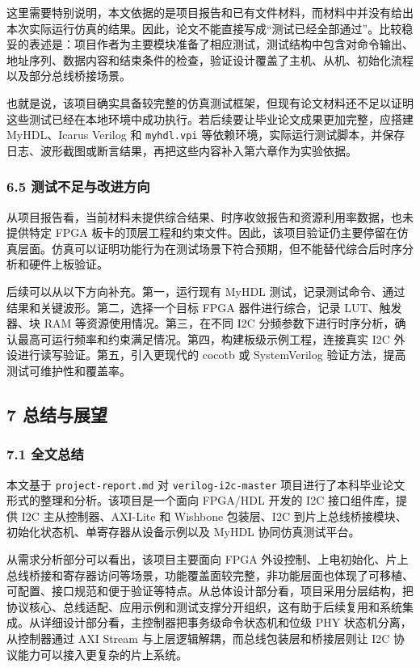 这里需要特别说明，本文依据的是项目报告和已有文件材料，而材料中并没有给出本次实际运行仿真的结果。因此，论文不能直接写成``测试已经全部通过''。比较稳妥的表述是：项目作者为主要模块准备了相应测试，测试结构中包含对命令输出、地址序列、数据内容和结束条件的检查，验证设计覆盖了主机、从机、初始化流程以及部分总线桥接场景。

也就是说，该项目确实具备较完整的仿真测试框架，但现有论文材料还不足以证明这些测试已经在本地环境中成功执行。若后续要让毕业论文成果更加完整，应搭建 MyHDL、Icarus Verilog 和 \texttt{myhdl.vpi} 等依赖环境，实际运行测试脚本，并保存日志、波形截图或断言结果，再把这些内容补入第六章作为实验依据。

\subsubsection{6.5 测试不足与改进方向}\label{ux6d4bux8bd5ux4e0dux8db3ux4e0eux6539ux8fdbux65b9ux5411}

从项目报告看，当前材料未提供综合结果、时序收敛报告和资源利用率数据，也未提供特定 FPGA 板卡的顶层工程和约束文件。因此，该项目验证仍主要停留在仿真层面。仿真可以证明功能行为在测试场景下符合预期，但不能替代综合后时序分析和硬件上板验证。

后续可以从以下方向补充。第一，运行现有 MyHDL 测试，记录测试命令、通过结果和关键波形。第二，选择一个目标 FPGA 器件进行综合，记录 LUT、触发器、块 RAM 等资源使用情况。第三，在不同 I2C 分频参数下进行时序分析，确认最高可运行频率和约束满足情况。第四，构建板级示例工程，连接真实 I2C 外设进行读写验证。第五，引入更现代的 cocotb 或 SystemVerilog 验证方法，提高测试可维护性和覆盖率。

\subsection{7 总结与展望}\label{ux603bux7ed3ux4e0eux5c55ux671b}

\subsubsection{7.1 全文总结}\label{ux5168ux6587ux603bux7ed3}

本文基于 \texttt{project-report.md} 对 \texttt{verilog-i2c-master} 项目进行了本科毕业论文形式的整理和分析。该项目是一个面向 FPGA/HDL 开发的 I2C 接口组件库，提供 I2C 主从控制器、AXI-Lite 和 Wishbone 包装层、I2C 到片上总线桥接模块、初始化状态机、单寄存器从设备示例以及 MyHDL 协同仿真测试平台。

从需求分析部分可以看出，该项目主要面向 FPGA 外设控制、上电初始化、片上总线桥接和寄存器访问等场景，功能覆盖面较完整，非功能层面也体现了可移植、可配置、接口规范和便于验证等特点。从总体设计部分看，项目采用分层结构，把协议核心、总线适配、应用示例和测试支撑分开组织，这有助于后续复用和系统集成。从详细设计部分看，主控制器把事务级命令状态机和位级 PHY 状态机分离，从控制器通过 AXI Stream 与上层逻辑解耦，而总线包装层和桥接层则让 I2C 协议能力可以接入更复杂的片上系统。

